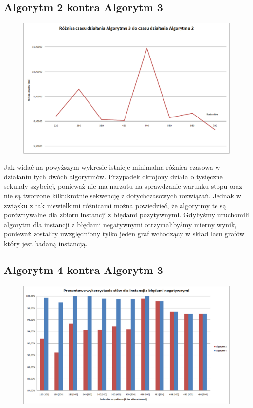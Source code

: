 \documentclass[a4paper,10pt]{article}
\begin{document}
\subsection{Algorytm 2 kontra Algorytm 3}

\begin{figure}[h]
  \footnotesize\centering
  \includegraphics[width=\textwidth,keepaspectratio]{timeDiff_general_vs_positive.png}
\end{figure}

Jak widać na powyższym wykresie istnieje minimalna różnica czasowa w działaniu tych dwóch algorytmów. Przypadek okrojony działa o tysięczne sekundy szybciej, ponieważ nie ma narzutu na sprawdzanie warunku stopu oraz nie są tworzone kilkukrotnie sekwencję z dotychczasowych rozwiązań. Jednak w związku z tak niewielkimi różnicami można powiedzieć, że algorytmy te są porównywalne dla zbioru instancji z błędami pozytywnymi.
Gdybyśmy uruchomili algorytm dla instancji z błędami negatywnymi otrzymalibyśmy mierny wynik, ponieważ zostałby uwzględniony tylko jeden graf wchodzący w skład lasu grafów który jest badaną instancją.

\subsection{Algorytm 4 kontra Algorytm 3}

\begin{figure}[h]
  \footnotesize\centering
  \includegraphics[width=\textwidth,keepaspectratio]{percentageUsedWords_general_vs_negative.png}
\end{figure}
\end{document}
